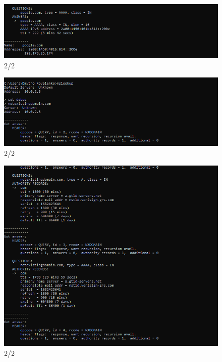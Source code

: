\documentclass{article}
\begin{document}
\begin{normalsize}
\begin{figure}[H]
	\centering
	\includegraphics[width=\textwidth]{35}
	\caption{2/2}
\end{figure}
\begin{figure}[H]
	\centering
	\includegraphics[width=\textwidth]{51}
	\caption{2/2}
\end{figure}
\begin{figure}[H]
	\centering
	\includegraphics[width=\textwidth]{52}
	\caption{2/2}
\end{figure}
\begin{figure}[H]
	\centering

\end{figure}
\end{normalsize}
\end{document}
